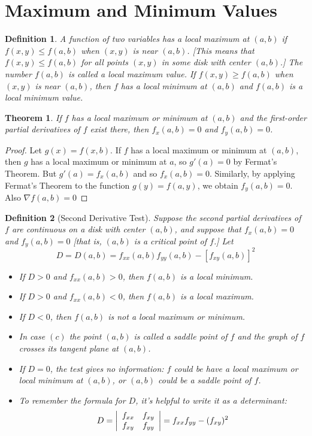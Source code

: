 \documentclass[10pt]{report}
\newtheorem{thm2}{Theorem}[section]
\newtheorem{def2}{Definition}[section]
\newcommand{\grad}{\nabla}
\begin{document}
\section{Maximum and Minimum Values}
\begin{def2}
A function of two variables has a local maximum at $(a,b)$ if $f(x,y)\leq f(a,b)$ when $(x,y)$ is near $(a,b)$. [This means that $f(x,y)\leq f(a,b)$ for all points $(x,y)$ in some disk with center $(a,b)$.] The number $f(a,b)$ is called a local maximum value. If $f(x,y) \geq f(a,b)$ when $(x,y)$ is near $(a,b)$, then $f$ has a local minimum at $(a,b)$ and $f(a,b)$ is a local minimum value.
\end{def2}
\begin{thm2}
If $f$ has a local maximum or minimum at $(a,b)$ and the first-order partial derivatives of $f$ exist there, then $f_x(a,b)=0$ and $f_y(a,b)=0$.
\end{thm2}
\begin{proof}
Let $g(x)=f(x,b)$. If $f$ has a local maximum or minimum at $(a,b)$, then $g$ has a local maximum or minimum at $a$, so $g'(a)=0$ by Fermat's Theorem. But $g'(a)=f_x(a,b)$ and so $f_x(a,b)=0$. Similarly, by applying Fermat's Theorem to the function $g(y)=f(a,y)$, we obtain $f_y(a,b)=0$. Also $\grad f(a,b)=0$
\end{proof}
\begin{def2}[Second Derivative Test]
Suppose the second partial derivatives of $f$ are continuous on a disk with center $(a,b)$, and suppose that $f_x(a,b)=0$ and $f_y(a,b)=0$ [that is, $(a,b)$ is a critical point of $f$.] Let
$$D=D(a,b)=f_{xx}(a,b)f_{yy}(a,b)-[f_{xy}(a,b)]^2$$
\begin{itemize}
\item[(a)] If $D>0$ and $f_{xx}(a,b)>0$, then $f(a,b)$ is a local minimum.
\item[(b)] If $D>0$ and $f_{xx}(a,b)<0$, then $f(a,b)$ is a local maximum.
\item[(c)] If $D<0$, then $f(a,b)$ is not a local maximum or minimum.
\end{itemize}
\begin{itemize}
\item[Note] In case $(c)$ the point $(a,b)$ is called a saddle point of $f$ and the graph of $f$ crosses its tangent plane at $(a,b)$.
\item[Note] If $D=0$, the test gives no information: $f$ could be have a local maximum or local minimum at $(a,b)$, or $(a,b)$ could be a saddle point of $f$.
\item[Note] To remember the formula for $D$, it's helpful to write it as a determinant:
$$D = \left| \begin{array}{c c}
f_{xx} & f_{xy}\\
f_{xy} & f_{yy}
\end{array}\right| = f_{xx}f_{yy} - (f_{xy})^2$$
\end{itemize}
\end{def2}
\end{document}
